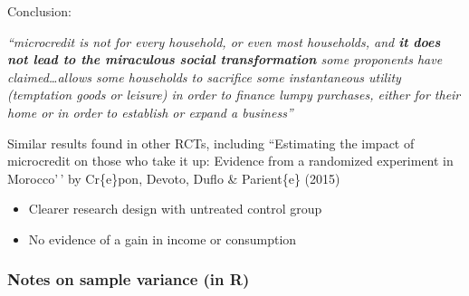 \documentclass[
  letterpaper,
  DIV=11,
  numbers=noendperiod]{scrreprt}
\newenvironment{Shaded}{\begin{snugshade}}{\end{snugshade}}
\newcommand{\AttributeTok}[1]{\textcolor[rgb]{0.40,0.45,0.13}{#1}}
\newcommand{\ConstantTok}[1]{\textcolor[rgb]{0.56,0.35,0.01}{#1}}
\newcommand{\DecValTok}[1]{\textcolor[rgb]{0.68,0.00,0.00}{#1}}
\newcommand{\FunctionTok}[1]{\textcolor[rgb]{0.28,0.35,0.67}{#1}}
\newcommand{\NormalTok}[1]{\textcolor[rgb]{0.00,0.23,0.31}{#1}}
\newcommand{\OtherTok}[1]{\textcolor[rgb]{0.00,0.23,0.31}{#1}}
\newcommand{\SpecialCharTok}[1]{\textcolor[rgb]{0.37,0.37,0.37}{#1}}
\newcommand{\StringTok}[1]{\textcolor[rgb]{0.13,0.47,0.30}{#1}}
\providecommand{\tightlist}{%
  \setlength{\itemsep}{0pt}\setlength{\parskip}{0pt}}\usepackage{longtable,booktabs,array}
\theoremstyle{definition}
\theoremstyle{remark}
\begin{document}
Conclusion:

\emph{``microcredit is not for every household, or even most households,
and \textbf{it does not lead to the miraculous social transformation}
some proponents have claimed\ldots allows some households to sacrifice
some instantaneous utility (temptation goods or leisure) in order to
finance lumpy purchases, either for their home or in order to establish
or expand a business''}

Similar results found in other RCTs, including ``Estimating the impact
of microcredit on those who take it up: Evidence from a randomized
experiment in Morocco'\,' by Cr\textquotesingle\{e\}pon, Devoto, Duflo
\& Parient\textquotesingle\{e\} (2015)

\par

\begin{itemize}
\tightlist
\item
  Clearer research design with untreated control group
\item
  No evidence of a gain in income or consumption
\end{itemize}

\hypertarget{notes-on-sample-variance-in-r}{%
\subsubsection{Notes on sample variance (in
R)}\label{notes-on-sample-variance-in-r}}

\begin{Shaded}
\end{Shaded}
\end{document}
